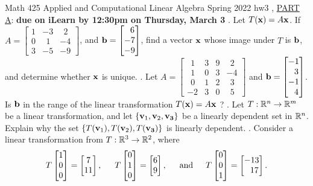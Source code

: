 \documentclass[12pt]{article}
\begin{document}
\noindent
Math 425 \qquad 
Applied and Computational Linear Algebra \qquad
Spring 2022
\vskip 5pt
\noindent
hw3 , \underline{PART A}: {\bf due on iLearn by 12:30pm on Thursday, March 3}
\vskip 10pt
. Let $T({\bf x}) = A{\bf x}$. If  
$A=\begin{bmatrix}
1 & -3 & ~~2\\
0 & ~~1 & -4\\
3 & -5 & -9
\end{bmatrix}$, and ${\bf b} = \begin{bmatrix}~~6\\ -7 \\ -9 \end{bmatrix}$, find a vector ${\bf x}$
whose image under $T$ is ${\bf b}$, and determine whether ${\bf x}$ is unique.
\vskip 10pt
. Let
$A=\begin{bmatrix}
~~1 & 3 & 9 & ~~2\\
~~1 & 0 & 3 & -4\\
~~0 & 1 & 2 & ~~3\\
-2 & 3 & 0 & ~~5
\end{bmatrix}$ and ${\bf b} = \begin{bmatrix} -1 \\ ~~3 \\ -1 \\ ~~4 \end{bmatrix}$. Is ${\bf b}$ in the
range of the linear transformation $T({\bf x}) = A{\bf x} $ ?
\vskip 10pt
. Let $T : {\Bbb R}^n \rightarrow {\Bbb R}^m$ be a linear transformation, and let 
$\left\{ {\bf v}_1, {\bf v}_2, {\bf v_3} \right \}$ be a linearly dependent set in ${\Bbb R}^n$. Explain
why the set $\left\{ T({\bf v}_1), T({\bf v}_2), T({\bf v_3}) \right \}$ is linearly dependent.
\vskip 10pt
. Consider a linear transformation from $T : {\Bbb R}^3 \rightarrow {\Bbb R}^2$, where 
\[
T\begin{bmatrix} 1 \\ 0 \\ 0 \end{bmatrix} = \begin{bmatrix} 7 \\ 11 \end{bmatrix},\hskip 15pt T\begin{bmatrix} 0 \\ 1 \\ 0 \end{bmatrix} = \begin{bmatrix} 6 \\ 9 \end{bmatrix},\hskip 15pt \mbox{and} \hskip 15pt
T\begin{bmatrix} 0 \\ 0 \\ 1 \end{bmatrix} = \begin{bmatrix} -13\\~~17\end{bmatrix}.
\]
\end{document}
